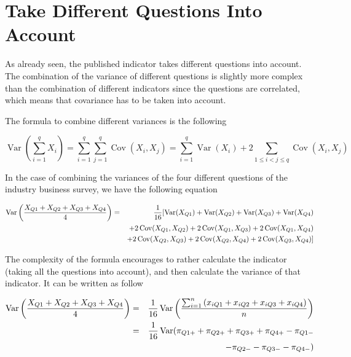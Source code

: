 \documentclass[12pt,a4paper,oneside]{book}
\DeclareMathOperator{\Var}{Var}
\DeclareMathOperator{\Cov}{Cov}
\begin{document}
\section{Take Different Questions Into Account}

As already seen, the published indicator takes different questions into account. 
The combination of the variance of different questions is slightly more complex than the combination of different indicators since the questions are correlated, which means that covariance has to be taken into account.

The formula to combine different variances is the following

\begin{equation}
\Var \left(\sum_{i=1}^{q} X_{i}\right) = \sum_{i=1}^{q} \sum_{j=1}^{q} \Cov\left(X_{i}, X_{j}\right)
= \sum_{i=1}^{q} \Var\left(X_{i}\right)+2 \sum_{1 \leq i<j \leq q} \Cov\left(X_{i}, X_{j}\right)
\end{equation} 

In the case of combining the variances of the four different questions of the industry business survey, we have the following equation

\begin{eqnarray}
    \Var \left(\frac{X_{Q1} + X_{Q2} + X_{Q3} + X_{Q4}}{4} \right) &=& \frac{1}{16} \large[ \Var(X_{Q1}) + \Var(X_{Q2}) + \Var(X_{Q3}) + \Var(X_{Q4}) \nonumber \\
    && + 2 \Cov (X_{Q1},X_{Q2}) + 2 \Cov (X_{Q1},X_{Q3}) + 2 \Cov (X_{Q1},X_{Q4}) \nonumber \\
    &&  + 2 \Cov (X_{Q2},X_{Q3}) + 2 \Cov (X_{Q2},X_{Q4}) + 2 \Cov (X_{Q3},X_{Q4}) \large] \nonumber \\
\end{eqnarray}

The complexity of the formula encourages to rather calculate the indicator (taking all the questions into account), and then calculate the variance of that indicator. It can be written as follow

\begin{eqnarray}
    \Var \left(\frac{X_{Q1} + X_{Q2} + X_{Q3} + X_{Q4}}{4} \right) 
    &=& \frac{1}{16} \Var \left(\frac{\sum_{i=1}^n \left(x_{i Q1} + x_{i Q2} + x_{i Q3} + x_{i Q4} \right)}{n} \right) \nonumber \\
    &=& \frac{1}{16} \Var \Large(\pi_{Q1+} + \pi_{Q2+} + \pi_{Q3+} + \pi_{Q4+} - \pi_{Q1-} \nonumber \\
&& - \pi_{Q2-} - \pi_{Q3-} - \pi_{Q4-}  \Large) 
\end{eqnarray}
\end{document}
